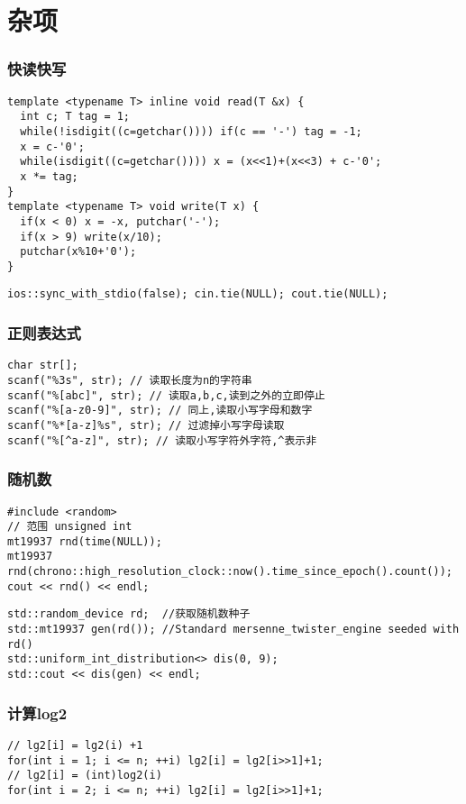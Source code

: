\documentclass[UTF8]{ctexart}
\begin{document}
     
\tableofcontents
\newpage
\part{杂项}

\section{快读快写}
{\setmainfont{Consolas}
\begin{lstlisting}
template <typename T> inline void read(T &x) {
  int c; T tag = 1;
  while(!isdigit((c=getchar()))) if(c == '-') tag = -1;
  x = c-'0';
  while(isdigit((c=getchar()))) x = (x<<1)+(x<<3) + c-'0';
  x *= tag;
}
template <typename T> void write(T x) {
  if(x < 0) x = -x, putchar('-');
  if(x > 9) write(x/10);
  putchar(x%10+'0');
}
\end{lstlisting}
{\setmainfont{Consolas}
\begin{lstlisting}
ios::sync_with_stdio(false); cin.tie(NULL); cout.tie(NULL);
\end{lstlisting}

\section{正则表达式 }
{\setmainfont{Consolas}
\begin{lstlisting}
char str[];
scanf("%3s", str); // 读取长度为n的字符串
scanf("%[abc]", str); // 读取a,b,c,读到之外的立即停止
scanf("%[a-z0-9]", str); // 同上,读取小写字母和数字
scanf("%*[a-z]%s", str); // 过滤掉小写字母读取
scanf("%[^a-z]", str); // 读取小写字符外字符,^表示非 
\end{lstlisting}
\section{随机数 }
{\setmainfont{Consolas}
\begin{lstlisting}
#include <random>
// 范围 unsigned int
mt19937 rnd(time(NULL));
mt19937 rnd(chrono::high_resolution_clock::now().time_since_epoch().count());
cout << rnd() << endl;
\end{lstlisting}
{\setmainfont{Consolas}
\begin{lstlisting}
std::random_device rd;  //获取随机数种子
std::mt19937 gen(rd()); //Standard mersenne_twister_engine seeded with rd()
std::uniform_int_distribution<> dis(0, 9);
std::cout << dis(gen) << endl;
\end{lstlisting}


\section{计算log2 }
{\setmainfont{Consolas}
\begin{lstlisting}
// lg2[i] = lg2(i) +1
for(int i = 1; i <= n; ++i) lg2[i] = lg2[i>>1]+1;
// lg2[i] = (int)log2(i)
for(int i = 2; i <= n; ++i) lg2[i] = lg2[i>>1]+1;
\end{lstlisting}
}}}}}}
\end{document}
